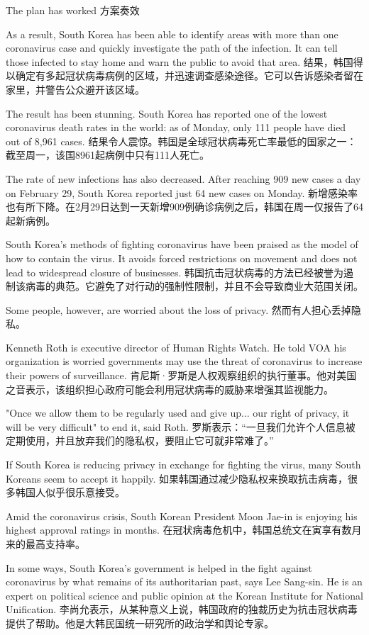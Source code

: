 The plan has worked
方案奏效

As a result, South Korea has been able to identify areas with more than one coronavirus case and quickly investigate the path of the infection. It can tell those infected to stay home and warn the public to avoid that area.
结果，韩国得以确定有多起冠状病毒病例的区域，并迅速调查感染途径。它可以告诉感染者留在家里，并警告公众避开该区域。

The result has been stunning. South Korea has reported one of the lowest coronavirus death rates in the world: as of Monday, only 111 people have died out of 8,961 cases.
结果令人震惊。韩国是全球冠状病毒死亡率最低的国家之一：截至周一，该国8961起病例中只有111人死亡。

The rate of new infections has also decreased. After reaching 909 new cases a day on February 29, South Korea reported just 64 new cases on Monday.
新增感染率也有所下降。在2月29日达到一天新增909例确诊病例之后，韩国在周一仅报告了64起新病例。

South Korea's methods of fighting coronavirus have been praised as the model of how to contain the virus. It avoids forced restrictions on movement and does not lead to widespread closure of businesses.
韩国抗击冠状病毒的方法已经被誉为遏制该病毒的典范。它避免了对行动的强制性限制，并且不会导致商业大范围关闭。

Some people, however, are worried about the loss of privacy.
然而有人担心丢掉隐私。

Kenneth Roth is executive director of Human Rights Watch. He told VOA his organization is worried governments may use the threat of coronavirus to increase their powers of surveillance.
肯尼斯·罗斯是人权观察组织的执行董事。他对美国之音表示，该组织担心政府可能会利用冠状病毒的威胁来增强其监视能力。

"Once we allow them to be regularly used and give up... our right of privacy, it will be very difficult" to end it, said Roth.
罗斯表示：“一旦我们允许个人信息被定期使用，并且放弃我们的隐私权，要阻止它可就非常难了。”

If South Korea is reducing privacy in exchange for fighting the virus, many South Koreans seem to accept it happily.
如果韩国通过减少隐私权来换取抗击病毒，很多韩国人似乎很乐意接受。

Amid the coronavirus crisis, South Korean President Moon Jae-in is enjoying his highest approval ratings in months.
在冠状病毒危机中，韩国总统文在寅享有数月来的最高支持率。

In some ways, South Korea's government is helped in the fight against coronavirus by what remains of its authoritarian past, says Lee Sang-sin. He is an expert on political science and public opinion at the Korean Institute for National Unification.
李尚允表示，从某种意义上说，韩国政府的独裁历史为抗击冠状病毒提供了帮助。他是大韩民国统一研究所的政治学和舆论专家。

